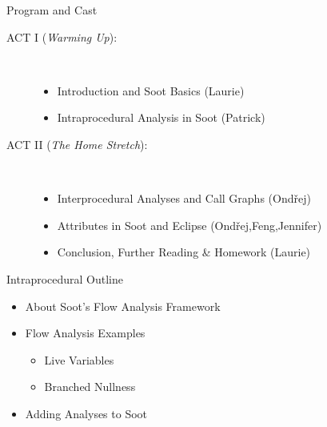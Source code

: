 \begin{slide}{Program and Cast}
\begin{description}
\item[ACT I ({\em Warming Up}):] \hspace{1in} \\
\begin{itemize}
\item Introduction and Soot Basics {\blue (Laurie)}
\item {\red Intraprocedural Analysis in Soot {\blue (Patrick)}}
\end{itemize}
\item[ACT II ({\em The Home Stretch}):] \hspace{1in} \\
\begin{itemize}
\item Interprocedural Analyses and Call Graphs {\blue (Ond\v{r}ej)}
\item Attributes in Soot and Eclipse {\blue (Ond\v{r}ej,Feng,Jennifer)}
\item Conclusion, Further Reading \& Homework {\blue (Laurie)}
\end{itemize}
\end{description}
\end{slide}

\begin{slide}{Intraprocedural Outline}
\begin{itemize}
\item About Soot's Flow Analysis Framework
\item Flow Analysis Examples
\begin{itemize} 
\item Live Variables
\item Branched Nullness
\end{itemize}
\item Adding Analyses to Soot
\end{itemize}
\end{slide}


